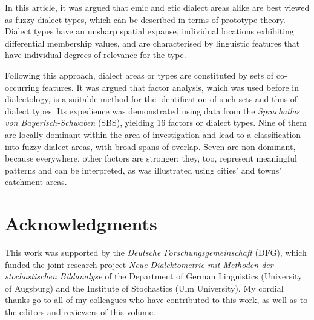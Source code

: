 \documentclass[output=paper]{LSP/langsci}
\begin{document}
In this article, it was argued that emic and etic dialect areas alike are best viewed as fuzzy dialect types, which can be described in terms of prototype theory. Dialect types have an unsharp spatial expanse, individual locations exhibiting differential membership values, and are characterised by linguistic features that have individual degrees of relevance for the type.

Following this approach, dialect areas or types are constituted by sets of co-occurring features. It was argued that factor analysis, which was used before in dialectology, is a suitable method for the identification of such sets and thus of dialect types. Its expedience was demonstrated using data from the \textit{Sprachatlas von Bayerisch-Schwaben} (SBS), yielding 16 factors or dialect types. Nine of them are locally dominant within the area of investigation and lead to a classification into fuzzy dialect areas, with broad spans of overlap. Seven are non-dominant, because everywhere, other factors are stronger; they, too, represent meaningful patterns and can be interpreted, as was illustrated using cities’ and towns’ catchment areas.

\section*{Acknowledgments}

This work was supported by the \textit{Deutsche Forschungsgemeinschaft} (DFG), which funded the joint research project \textit{Neue Dialektometrie mit Methoden der stochastischen Bildanalyse} of the Department of German Linguistics (University of Augsburg) and the Institute of Stochastics (Ulm University). My cordial thanks go to all of my colleagues who have contributed to this work, as well as to the editors and reviewers of this volume.

\printbibliography[heading=subbibliography,notkeyword=this]
\end{document}
